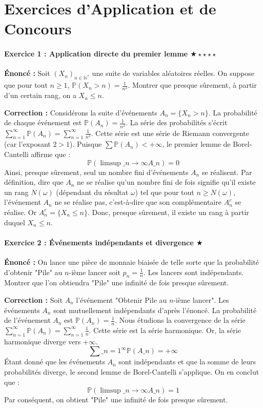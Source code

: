 \documentclass[11pt,a4paper]{article}
\begin{document}
\newpage
\part{Exercices d'Application et de Concours}

\subsection*{Exercice 1 : Application directe du premier lemme \quad $\bigstar\star\star\star\star$}





\textbf{Énoncé :}
Soit $(X_n)_{n \in \mathbb{N}^*}$ une suite de variables aléatoires réelles. On suppose que pour tout $n \ge 1$, $\mathbb{P}(X_n > n) = \frac{1}{n^2}$.
Montrer que presque sûrement, à partir d'un certain rang, on a $X_n \le n$.

\textbf{Correction :}
Considérons la suite d'événements $A_n = \{X_n > n\}$.
La probabilité de chaque événement est $\mathbb{P}(A_n) = \frac{1}{n^2}$.
La série des probabilités s'écrit $\sum_{n=1}^\infty \mathbb{P}(A_n) = \sum_{n=1}^\infty \frac{1}{n^2}$.
Cette série est une série de Riemann convergente (car l'exposant $2 > 1$).
Puisque $\sum \mathbb{P}(A_n) < +\infty$, le premier lemme de Borel-Cantelli affirme que :
$$ \mathbb{P}(\limsup\_{n \to \infty} A\_n) = 0 $$
Ainsi, presque sûrement, seul un nombre fini d'événements $A_n$ se réalisent.
Par définition, dire que $A_n$ ne se réalise qu'un nombre fini de fois signifie qu'il existe un rang $N(\omega)$ (dépendant du résultat $\omega$) tel que pour tout $n \ge N(\omega)$, l'événement $A_n$ ne se réalise pas, c'est-à-dire que son complémentaire $A_n^c$ se réalise.
Or $A_n^c = \{X_n \le n\}$.
Donc, presque sûrement, il existe un rang à partir duquel $X_n \le n$.


\subsection*{Exercice 2 : Événements indépendants et divergence \quad $\bigstar$}





\textbf{Énoncé :}
On lance une pièce de monnaie biaisée de telle sorte que la probabilité d'obtenir "Pile" au $n$-ième lancer soit $p_n = \frac{1}{n}$. Les lancers sont indépendants.
Montrer que l'on obtiendra "Pile" une infinité de fois presque sûrement.

\textbf{Correction :}
Soit $A_n$ l'événement "Obtenir Pile au $n$-ième lancer".
Les événements $A_n$ sont mutuellement indépendants d'après l'énoncé.
La probabilité de l'événement $A_n$ est $\mathbb{P}(A_n) = \frac{1}{n}$.
Nous étudions la convergence de la série $\sum_{n=1}^\infty \mathbb{P}(A_n) = \sum_{n=1}^\infty \frac{1}{n}$.
Cette série est la série harmonique. Or, la série harmonique diverge vers $+\infty$.
$$ \sum\_{n=1}^\infty \mathbb{P}(A\_n) = +\infty $$
Étant donné que les événements $A_n$ sont indépendants et que la somme de leurs probabilités diverge, le second lemme de Borel-Cantelli s'applique.
On en conclut que :
$$ \mathbb{P}(\limsup\_{n \to \infty} A\_n) = 1 $$
Par conséquent, on obtient "Pile" une infinité de fois presque sûrement.
\end{document}
